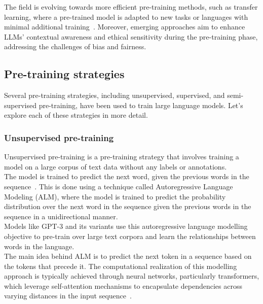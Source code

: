 The field is evolving towards more efficient pre-training methods, such as transfer learning, where a pre-trained model is adapted to new tasks or languages with minimal additional training~\cite{ruder2019transfer}.
Moreover, emerging approaches aim to enhance LLMs' contextual awareness and ethical sensitivity during the pre-training phase, addressing the challenges of bias and fairness.

\subsection{Pre-training strategies}
\label{subsec:pre-training-strategies}

Several pre-training strategies, including unsupervised, supervised, and semi-supervised pre-training, have been used to train large language models.
Let's explore each of these strategies in more detail.

\subsubsection{Unsupervised pre-training}
\label{subsubsec:unsupervised-pre-training}

Unsupervised pre-training is a pre-training strategy that involves training a model on a large corpus of text data without any labels or annotations.\\
The model is trained to predict the next word, given the previous words in the sequence~\cite{brown2020language}.
This is done using a technique called Autoregressive Language Modeling (ALM), where the model is trained to predict the probability distribution over the next word in the sequence given the previous words in the sequence in a unidirectional manner.\\
Models like GPT-3 and its variants use this autoregressive language modelling objective to pre-train over large text corpora and learn the relationships between words in the language.\\
The main idea behind ALM is to predict the next token in a sequence based on the tokens that precede it.
The computational realization of this modelling approach is typically achieved through neural networks, particularly transformers, which leverage self-attention mechanisms to encapsulate dependencies across varying distances in the input sequence~\cite{vaswani2023attention}.


